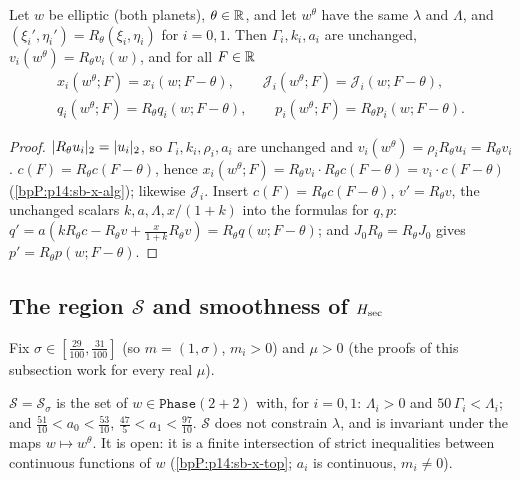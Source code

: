 \begin{lemma}\label{bpP:p14:sb-cov}
Let $w$ be elliptic (both planets), $\theta\in\mathbb{R}$, and let $w^\theta$ have the same $\lambda$ and $\Lambda$, and $(\xi_i',\eta_i')=R_\theta(\xi_i,\eta_i)$ for $i=0,1$. Then $\Gamma_i,k_i,a_i$ are unchanged, $v_i(w^\theta)=R_\theta v_i(w)$, and for all $F\in\mathbb{R}$
\begin{gather*}x_i(w^\theta;F)=x_i(w;F-\theta),\qquad \mathcal J_i(w^\theta;F)=\mathcal J_i(w;F-\theta),\\ q_i(w^\theta;F)=R_\theta q_i(w;F-\theta),\qquad p_i(w^\theta;F)=R_\theta p_i(w;F-\theta).\end{gather*}
\end{lemma}
\begin{proof}
\label{stepP:p14:sb-cv-1} $\lvert R_\theta u_i\rvert_2=\lvert u_i\rvert_2$, so $\Gamma_i,k_i,\rho_i,a_i$ are unchanged and $v_i(w^\theta)=\rho_iR_\theta u_i=R_\theta v_i$.
\label{stepP:p14:sb-cv-2} $c(F)=R_\theta c(F-\theta)$, hence $x_i(w^\theta;F)=R_\theta v_i\cdot R_\theta c(F-\theta)=v_i\cdot c(F-\theta)$ (\ref{bpP:p14:sb-x-alg}); likewise $\mathcal J_i$.
\label{stepP:p14:sb-cv-3} Insert $c(F)=R_\theta c(F-\theta)$, $v'=R_\theta v$, the unchanged scalars $k,a,\Lambda,x/(1+k)$ into the formulas for $q,p$: $q'=a(kR_\theta c-R_\theta v+\frac x{1+k}R_\theta v)=R_\theta q(w;F-\theta)$; and $J_0R_\theta=R_\theta J_0$ gives $p'=R_\theta p(w;F-\theta)$.
\end{proof}

\subsection{The region $\mathcal S$ and smoothness of $H_{\rm sec}$}\label{bpP:p14:sb-smooth}

Fix $\sigma\in[\frac{29}{100},\frac{31}{100}]$ (so $m=(1,\sigma)$, $m_i>0$) and $\mu>0$ (the proofs of this subsection work for every real $\mu$).

\begin{definition}\label{bpP:p14:sb-Sdef}
$\mathcal S=\mathcal S_\sigma$ is the set of $w\in\texttt{Phase}(2+2)$ with, for $i=0,1$: $\Lambda_i>0$ and $50\,\Gamma_i<\Lambda_i$; and $\frac{51}{10}<a_0<\frac{53}{10}$, $\frac{47}5<a_1<\frac{97}{10}$.
$\mathcal S$ does not constrain $\lambda$, and is invariant under the maps $w\mapsto w^\theta$. It is open: it is a finite intersection of strict inequalities between continuous functions of $w$ (\ref{bpP:p14:sb-x-top}; $a_i$ is continuous, $m_i\ne0$).
\end{definition}

